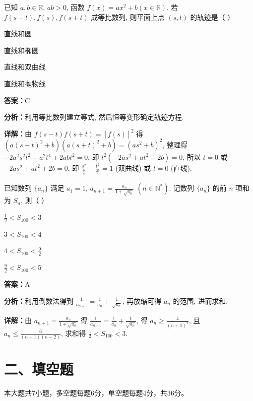 \begin{question}[points=4]
已知 $a,b\in\mathbb{R}$, $ab>0$, 函数 $f(x)=ax^2+b(x\in\mathbb{R})$. 若 $f(s-t), f(s), f(s+t)$ 成等比数列, 则平面上点 $(s,t)$ 的轨迹是（   ）
\begin{choices}
  \item 直线和圆
  \item 直线和椭圆
  \item 直线和双曲线
  \item 直线和抛物线
\end{choices}
\begin{solution}
\textbf{答案：}C

\textbf{分析：}利用等比数列建立等式, 然后恒等变形确定轨迹方程.

\textbf{详解：}由 $f(s-t)f(s+t)=[f(s)]^2$ 得 $(a(s-t)^2+b)(a(s+t)^2+b) = (as^2+b)^2$, 整理得 $-2a^2s^2t^2+a^2t^4+2abt^2=0$, 即 $t^2(-2a s^2 + a t^2 + 2b)=0$, 所以 $t=0$ 或 $-2as^2+at^2+2b=0$, 即 $\frac{s^2}{\frac{b}{a}} - \frac{t^2}{\frac{2b}{a}}=1$ (双曲线) 或 $t=0$ (直线).
\end{solution}
\end{question}

\begin{question}[points=4]
已知数列 $\{a_n\}$ 满足 $a_1=1$, $a_{n+1} = \frac{a_n}{1+\sqrt{a_n}}$ $(n\in\mathbb{N}^*)$. 记数列 $\{a_n\}$ 的前 $n$ 项和为 $S_n$, 则（   ）
\begin{choices}
  \item $\frac{1}{2} < S_{100} < 3$
  \item $3 < S_{100} < 4$
  \item $4 < S_{100} < \frac{9}{2}$
  \item $\frac{9}{2} < S_{100} < 5$
\end{choices}
\begin{solution}
\textbf{答案：}A

\textbf{分析：}利用倒数法得到 $\frac{1}{a_{n+1}} = \frac{1}{a_n} + \frac{1}{\sqrt{a_n}}$, 再放缩可得 $a_n$ 的范围, 进而求和.

\textbf{详解：}由 $a_{n+1} = \frac{a_n}{1+\sqrt{a_n}}$ 得 $\frac{1}{a_{n+1}} = \frac{1}{a_n} + \frac{1}{\sqrt{a_n}}$, 得 $a_n \geq \frac{4}{(n+1)^2}$, 且 $a_n \leq \frac{6}{(n+1)(n+2)}$, 求和得 $\frac{1}{2} < S_{100} < 3$.
\end{solution}
\end{question}

\section*{二、填空题}
本大题共7小题，多空题每题6分，单空题每题4分，共36分。

